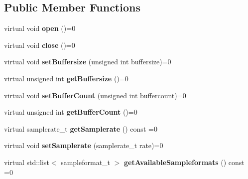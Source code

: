 \subsection*{Public Member Functions}
\begin{DoxyCompactItemize}
\item 
\hypertarget{classNl_1_1Audio_a3da276862af02fe20717d07527eb2a3f}{}virtual void {\bfseries open} ()=0\label{classNl_1_1Audio_a3da276862af02fe20717d07527eb2a3f}

\item 
\hypertarget{classNl_1_1Audio_ab8bf0d58ba2f88514c7d6b1756678175}{}virtual void {\bfseries close} ()=0\label{classNl_1_1Audio_ab8bf0d58ba2f88514c7d6b1756678175}

\item 
\hypertarget{classNl_1_1Audio_ad8e03febba94313406f192d7d70eb109}{}virtual void {\bfseries set\+Buffersize} (unsigned int buffersize)=0\label{classNl_1_1Audio_ad8e03febba94313406f192d7d70eb109}

\item 
\hypertarget{classNl_1_1Audio_a2e3c5209b59e9abe5dd7d04dfef301cb}{}virtual unsigned int {\bfseries get\+Buffersize} ()=0\label{classNl_1_1Audio_a2e3c5209b59e9abe5dd7d04dfef301cb}

\item 
\hypertarget{classNl_1_1Audio_a9cca4b557c979fb6bb8c5a7b8978904d}{}virtual void {\bfseries set\+Buffer\+Count} (unsigned int buffercount)=0\label{classNl_1_1Audio_a9cca4b557c979fb6bb8c5a7b8978904d}

\item 
\hypertarget{classNl_1_1Audio_af133dbf0605d95370f745d6d0e7373dc}{}virtual unsigned int {\bfseries get\+Buffer\+Count} ()=0\label{classNl_1_1Audio_af133dbf0605d95370f745d6d0e7373dc}

\item 
\hypertarget{classNl_1_1Audio_a43cd4e1ad7d5b2ff9adc614d31ecd2c8}{}virtual samplerate\+\_\+t {\bfseries get\+Samplerate} () const =0\label{classNl_1_1Audio_a43cd4e1ad7d5b2ff9adc614d31ecd2c8}

\item 
\hypertarget{classNl_1_1Audio_a4aa2440aca1c97e4776c789432f37306}{}virtual void {\bfseries set\+Samplerate} (samplerate\+\_\+t rate)=0\label{classNl_1_1Audio_a4aa2440aca1c97e4776c789432f37306}

\item 
\hypertarget{classNl_1_1Audio_ab75bfef4a7b8cb95fd5e428a9dd2a19f}{}virtual std\+::list$<$ sampleformat\+\_\+t $>$ {\bfseries get\+Available\+Sampleformats} () const =0\label{classNl_1_1Audio_ab75bfef4a7b8cb95fd5e428a9dd2a19f}


\end{DoxyCompactItemize}
